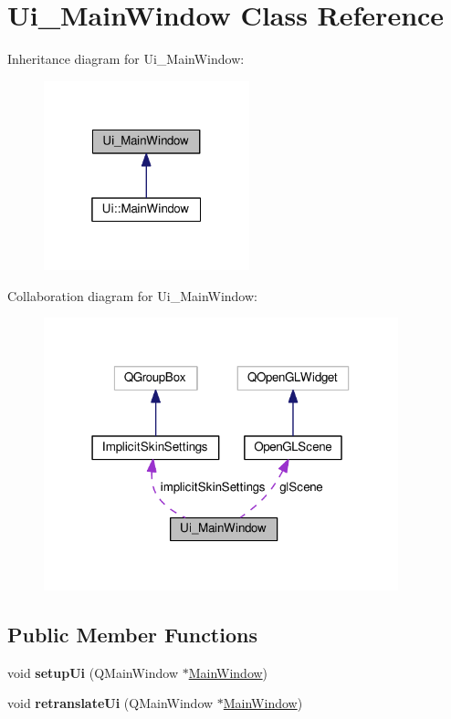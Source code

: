 \hypertarget{classUi__MainWindow}{}\section{Ui\+\_\+\+Main\+Window Class Reference}
\label{classUi__MainWindow}


Inheritance diagram for Ui\+\_\+\+Main\+Window\+:\nopagebreak
\begin{figure}[H]
\begin{center}
\leavevmode
\includegraphics[width=169pt]{d9/dd5/classUi__MainWindow__inherit__graph}
\end{center}
\end{figure}


Collaboration diagram for Ui\+\_\+\+Main\+Window\+:
\nopagebreak
\begin{figure}[H]
\begin{center}
\leavevmode
\includegraphics[width=291pt]{d8/d11/classUi__MainWindow__coll__graph}
\end{center}
\end{figure}
\subsection*{Public Member Functions}
\begin{DoxyCompactItemize}
\item 
void {\bfseries setup\+Ui} (Q\+Main\+Window $\ast$\hyperlink{classMainWindow}{Main\+Window})\hypertarget{classUi__MainWindow_acf4a0872c4c77d8f43a2ec66ed849b58}{}\label{classUi__MainWindow_acf4a0872c4c77d8f43a2ec66ed849b58}

\item 
void {\bfseries retranslate\+Ui} (Q\+Main\+Window $\ast$\hyperlink{classMainWindow}{Main\+Window})\hypertarget{classUi__MainWindow_a097dd160c3534a204904cb374412c618}{}\label{classUi__MainWindow_a097dd160c3534a204904cb374412c618}

\end{DoxyCompactItemize}
